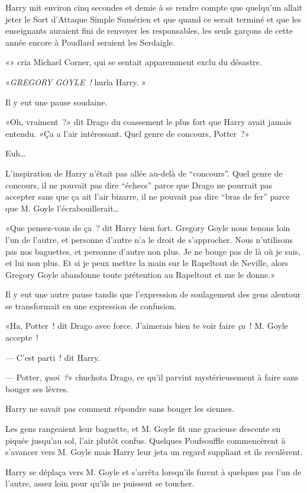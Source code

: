 Harry mit environ cinq secondes et demie à se rendre compte que quelqu'un allait jeter le Sort d'Attaque Simple Sumérien et que quand ce serait terminé et que les enseignants auraient fini de renvoyer les responsables, les seuls garçons de cette année encore à Poudlard seraient les Serdaigle.

«» cria Michael Corner, qui se sentait apparemment exclu du désastre.

«\emph{GREGORY GOYLE~!} hurla Harry. »

Il y eut une pause soudaine.

«Oh, vraiment~?» dit Drago du coassement le plus fort que Harry avait jamais entendu. «Ça a l'air intéressant. Quel genre de concours, Potter~?»

Euh…

L'inspiration de Harry n'était pas allée au-delà de “concours”. Quel genre de concours, il ne pouvait pas dire “échecs” parce que Drago ne pourrait pas accepter sans que ça ait l'air bizarre, il ne pouvait pas dire “bras de fer” parce que M. Goyle l'écrabouillerait…

«Que pensez-vous de ça~? dit Harry bien fort. Gregory Goyle nous tenons loin l'un de l'autre, et personne d'autre n'a le droit de s'approcher. Nous n'utilisons pas nos baguettes, et personne d'autre non plus. Je ne bouge pas de là où je suis, et lui non plus. Et si je peux mettre la main sur le Rapeltout de Neville, alors Gregory Goyle abandonne toute prétention au Rapeltout et me le donne.»

Il y eut une autre pause tandis que l'expression de soulagement des gens alentour se transformait en une expression de confusion.

«Ha, Potter~! dit Drago avec force. J'aimerais bien te voir faire \emph{ça}~! M. Goyle accepte~!

--- C'est parti~! dit Harry.

--- Potter, \emph{quoi~?}» chuchota Drago, ce qu'il parvint mystérieusement à faire sans bouger ses lèvres.

Harry ne savait pas comment répondre sans bouger les siennes.

Les gens rangeaient leur baguette, et M. Goyle fit une gracieuse descente en piquée jusqu'au sol, l'air plutôt confus. Quelques Poufsouffle commencèrent à s'avancer vers M. Goyle mais Harry leur jeta un regard suppliant et ils reculèrent.

Harry se déplaça vers M. Goyle et s'arrêta lorsqu'ils furent à quelques pas l'un de l'autre, assez loin pour qu'ils ne puissent se toucher.

